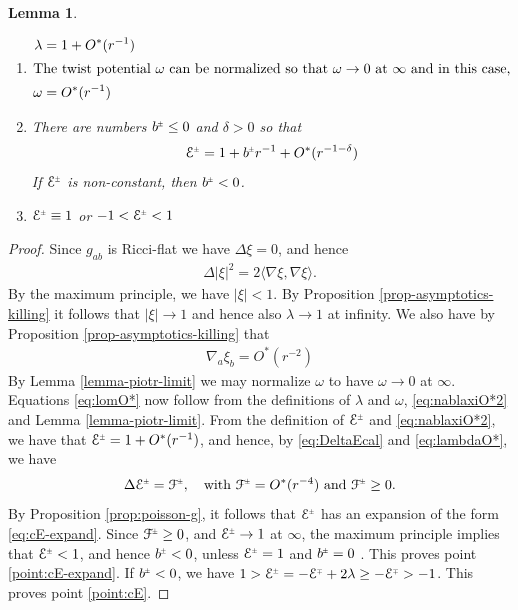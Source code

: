 \documentclass[a4paper,10pt,reqno]{amsart}
\newcommand{\la}{\langle}
\newcommand{\ra}{\rangle}
\newcommand{\cE}{\mathcal{E}}
\theoremstyle{plain}
\newtheorem{lemma}[thm]{Lemma}
\newcommand{\PM}[1]{{{#1}^{\hspace{-.5pt}\scaleto{\pm}{3.5pt}}}}
\newcommand{\MP}[1]{{{#1}^{\hspace{-.5pt}\scaleto{\mp}{3.5pt}}}}
\def\Fcal{\mathcal{F}}
\numberwithin{equation}{section}
\begin{document}
\begin{lemma}
\label{lem:Eprop}  
\begin{enumerate} 
\item \label{point:lmnO*} 
\begin{subequations}\label{eq:lomO*}
\begin{align} 
\lambda ={}& 1 + O^*(r^{-1}) \label{eq:lambdaO*}  \\
\intertext{The twist potential $\omega$ can be normalized so that $\omega \rightarrow 0$ at $\infty$ and in this case,} 
\omega ={}& O^*(r^{-1}) \label{eq:omegaO*} 
\end{align} 
\end{subequations} 
\item \label{point:cE-expand}
There are numbers $\PM{b} \leq 0$ and  $\delta > 0$ so that
\begin{align} \label{eq:cE-expand} 
\PM{\cE} = 1 + \PM{b} r^{-1} + O^*(r^{-1- \delta})
\end{align} 
If $\PM{\cE}$ is non-constant, then $\PM{b} < 0$. 
\item \label{point:cE} 
$\PM{\cE} \equiv 1$ or $-1 < \PM{\cE} < 1$ 
\end{enumerate} 
\end{lemma} 
\begin{proof} 

Since  $g_{ab}$ is Ricci-flat we have $\Delta \xi = 0$, and hence
\begin{align} 
\Delta |\xi|^2 = 2 \la \nabla\xi, \nabla\xi\ra . 
\end{align} 
By the maximum principle, we have $|\xi| < 1$. By Proposition \ref{prop-asymptotics-killing} it follows that $|\xi| \to 1$ and hence also $\lambda \to 1$ at infinity. 
We also have by Proposition \ref{prop-asymptotics-killing} that \begin{align} \label{eq:nablaxiO*2}
\nabla_a \xi_b = O^*(r^{-2})
\end{align} 
By Lemma \ref{lemma-piotr-limit} we may normalize $\omega$ to have $\omega \rightarrow 0$ at $\infty$. 
Equations \eqref{eq:lomO*} now follow from the definitions of $\lambda$ and $\omega$, \eqref{eq:nablaxiO*2} and Lemma \ref{lemma-piotr-limit}. 
From the definition of $\PM{\cE}$ and \eqref{eq:nablaxiO*2}, we have that $\PM{\cE} = 1 + O^*(r^{-1})$, and hence, by \eqref{eq:DeltaEcal} and \eqref{eq:lambdaO*}, we have 
\begin{align} \label{eq:Duf}
\Delta \PM{\cE} = \PM{\Fcal}, \quad \text{with $\PM{\Fcal} = O^*(r^{-4})$ and $\PM{\Fcal} \geq 0$.}
\end{align}
By Proposition \ref{prop:poisson-g}, it follows that 
$\PM{\cE}$ has an expansion of the form \eqref{eq:cE-expand}. Since $\PM{\Fcal} \geq 0$, and $\PM{\cE} \to 1$ at $\infty$, the maximum principle implies that $\PM{\cE} < 1$, and hence $\PM{b} < 0$, unless $\PM{\cE} = 1$ and $\PM{b} = 0$ . This proves point \eqref{point:cE-expand}. 
If $\PM{b} < 0$, we have $1 > \PM{\cE} = - \MP{\cE} + 2\lambda \geq - \MP{\cE} > -1$. This proves point \eqref{point:cE}.
\end{proof} 
\end{document}
